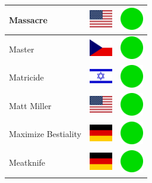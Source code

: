 \documentclass[12pt, a4paper, twoside]{report}
\begin{document}
\begin{center}
\begin{longtable}{|p{5cm}|p{2cm}|p{2cm}|}
 Massacre                                                   & \includegraphics[width=1cm]{../img/flags/us} &   \includegraphics[width=1cm]{../likes/y} \\ \hline
 Master                                                     & \includegraphics[width=1cm]{../img/flags/cz} &   \includegraphics[width=1cm]{../likes/y} \\ \hline
 Matricide                                                  & \includegraphics[width=1cm]{../img/flags/il} &   \includegraphics[width=1cm]{../likes/y} \\ \hline
 Matt Miller                                                & \includegraphics[width=1cm]{../img/flags/us} &   \includegraphics[width=1cm]{../likes/y} \\ \hline
 Maximize Bestiality                                        & \includegraphics[width=1cm]{../img/flags/de} &   \includegraphics[width=1cm]{../likes/y} \\ \hline
 Meatknife                                                  & \includegraphics[width=1cm]{../img/flags/de} &   \includegraphics[width=1cm]{../likes/y} \\ \hline

\end{longtable}
\end{center}
\end{document}
